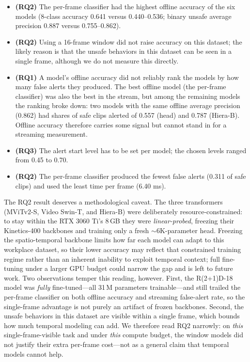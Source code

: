 \documentclass[conference]{IEEEtran}
\begin{document}
\begin{itemize}
    \item \textbf{(RQ2)} The per-frame classifier had the highest offline
    accuracy of the six models (8-class accuracy 0.641 versus 0.440--0.536;
    binary unsafe average precision 0.887 versus 0.755--0.862).

    \item \textbf{(RQ2)} Using a 16-frame window did not raise accuracy on
    this dataset; the likely reason is that the unsafe behaviors in this
    dataset can be seen in a single frame, although we do not measure this
    directly.

    \item \textbf{(RQ1)} A model's offline accuracy did not reliably rank
    the models by how many false alerts they produced. The best offline
    model (the per-frame classifier) was also the best in the stream, but
    among the remaining models the ranking broke down: two models with the
    same offline average precision (0.862) had shares of safe clips alerted
    of 0.557 (head) and 0.787 (Hiera-B). Offline accuracy therefore carries
    some signal but cannot stand in for a streaming measurement.

    \item \textbf{(RQ3)} The alert start level has to be set per model; the
    chosen levels ranged from 0.45 to 0.70.

    \item \textbf{(RQ2)} The per-frame classifier produced the fewest false
    alerts (0.311 of safe clips) and used the least time per frame
    (6.40 ms).
\end{itemize}

The RQ2 result deserves a methodological caveat. The three transformers
(MViTv2-S, Video Swin-T, and Hiera-B) were deliberately resource-constrained: to
stay within the RTX 3060 Ti's 8\,GB they were \emph{linear-probed}, freezing their
Kinetics-400 backbones and training only a fresh ${\sim}6$K-parameter head.
Freezing the spatio-temporal backbone limits how far each model can adapt to this
workplace dataset, so their lower accuracy may reflect that constrained training
regime rather than an inherent inability to exploit temporal context; full
fine-tuning under a larger GPU budget could narrow the gap and is left to future
work. Two observations temper this reading, however. First, the R(2+1)D-18 model
was \emph{fully} fine-tuned---all 31\,M parameters trainable---and still trailed
the per-frame classifier on both offline accuracy and streaming false-alert rate,
so the single-frame advantage is not purely an artifact of frozen backbones.
Second, the unsafe behaviors in this dataset are visible within a single frame,
which bounds how much temporal modeling can add. We therefore read RQ2 narrowly:
on \emph{this} single-frame-visible task and under \emph{this} compute budget, the
window models did not justify their extra per-frame cost---not as a general claim
that temporal models cannot help.
\end{document}
